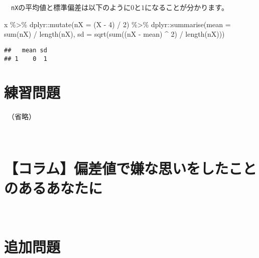 \documentclass[
  12pt,
]{book}
\newenvironment{Shaded}{\begin{snugshade}}{\end{snugshade}}
\newcommand{\AttributeTok}[1]{\textcolor[rgb]{0.77,0.63,0.00}{#1}}
\newcommand{\DecValTok}[1]{\textcolor[rgb]{0.00,0.00,0.81}{#1}}
\newcommand{\FunctionTok}[1]{\textcolor[rgb]{0.00,0.00,0.00}{#1}}
\newcommand{\NormalTok}[1]{#1}
\newcommand{\SpecialCharTok}[1]{\textcolor[rgb]{0.00,0.00,0.00}{#1}}
\begin{document}
　\texttt{nX}の平均値と標準偏差は以下のように\(0\)と\(1\)になることが分かります。

\begin{Shaded}
\begin{Highlighting}[]
\NormalTok{x }\SpecialCharTok{\%\textgreater{}\%} 
\NormalTok{  dplyr}\SpecialCharTok{::}\FunctionTok{mutate}\NormalTok{(}\AttributeTok{nX =}\NormalTok{ (X }\SpecialCharTok{{-}} \DecValTok{4}\NormalTok{) }\SpecialCharTok{/} \DecValTok{2}\NormalTok{) }\SpecialCharTok{\%\textgreater{}\%} 
\NormalTok{  dplyr}\SpecialCharTok{::}\FunctionTok{summarise}\NormalTok{(}\AttributeTok{mean =} \FunctionTok{sum}\NormalTok{(nX) }\SpecialCharTok{/} \FunctionTok{length}\NormalTok{(nX),}
                   \AttributeTok{sd =} \FunctionTok{sqrt}\NormalTok{(}\FunctionTok{sum}\NormalTok{((nX }\SpecialCharTok{{-}}\NormalTok{ mean) }\SpecialCharTok{\^{}} \DecValTok{2}\NormalTok{) }\SpecialCharTok{/} \FunctionTok{length}\NormalTok{(nX)))}
\end{Highlighting}
\end{Shaded}

\begin{verbatim}
##   mean sd
## 1    0  1
\end{verbatim}

\hypertarget{ux7df4ux7fd2ux554fux984c-3}{%
\section*{練習問題}\label{ux7df4ux7fd2ux554fux984c-3}}

　（省略）

　

\hypertarget{ux30b3ux30e9ux30e0ux504fux5deeux5024ux3067ux5accux306aux601dux3044ux3092ux3057ux305fux3053ux3068ux306eux3042ux308bux3042ux306aux305fux306b}{%
\section*{【コラム】偏差値で嫌な思いをしたことのあるあなたに}\label{ux30b3ux30e9ux30e0ux504fux5deeux5024ux3067ux5accux306aux601dux3044ux3092ux3057ux305fux3053ux3068ux306eux3042ux308bux3042ux306aux305fux306b}}

　

\hypertarget{ux8ffdux52a0ux554fux984c}{%
\section*{追加問題}\label{ux8ffdux52a0ux554fux984c}}
\end{document}
